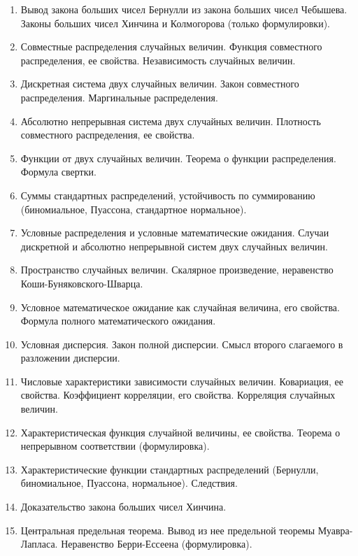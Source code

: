 \begin{enumerate}
    \item Вывод закона больших чисел Бернулли из закона больших чисел Чебышева. Законы больших чисел Хинчина и Колмогорова (только формулировки).
    \item Совместные распределения случайных величин. Функция совместного распределения, ее свойства. Независимость случайных величин.
    \item Дискретная система двух случайных величин. Закон совместного распределения. Маргинальные распределения.
    \item Абсолютно непрерывная система двух случайных величин. Плотность совместного распределения, ее свойства.
    \item Функции от двух случайных величин. Теорема о функции распределения. Формула свертки.
    \item Суммы стандартных распределений, устойчивость по суммированию (биномиальное, Пуассона, стандартное нормальное).
    \item Условные распределения и условные математические ожидания. Случаи дискретной и абсолютно непрерывной систем двух случайных величин.
    \item Пространство случайных величин. Скалярное произведение, неравенство Коши-Буняковского-Шварца. 
    \item Условное математическое ожидание как случайная величина, его свойства. Формула полного математического ожидания.
    \item Условная дисперсия. Закон полной дисперсии. Смысл второго слагаемого в разложении дисперсии.
    \item Числовые характеристики зависимости случайных величин. Ковариация, ее свойства. Коэффициент корреляции, его свойства. Корреляция случайных величин.
    \item Характеристическая функция случайной величины, ее свойства. Теорема о непрерывном соответствии (формулировка).
    \item Характеристические функции стандартных распределений (Бернулли, биномиальное, Пуассона, нормальное). Следствия.
    \item Доказательство закона больших чисел Хинчина.
    \item Центральная предельная теорема. Вывод из нее предельной теоремы Муавра-Лапласа. Неравенство Берри-Ессеена (формулировка). 
\end{enumerate}
